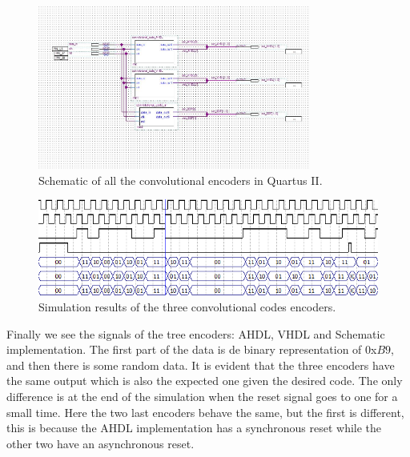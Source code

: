 \documentclass[12pt]{article}   	%
\begin{document}
\begin{figure}[htbp]
\begin{center}
\includegraphics[width=0.8\textwidth]{img/conv_code_comparison.jpg}
\caption{Schematic of all the convolutional encoders in Quartus II.}
\label{fig:conv_code_comp}
\end{center}
\end{figure}



\begin{figure}[htbp]
\begin{center}
\includegraphics[width=\textwidth]{img/conv_code_comp_sim}
\caption{Simulation results of the three convolutional codes encoders.}
\label{fig:sim_conv_code}
\end{center}
\end{figure}


Finally we see the signals of the tree encoders: AHDL, VHDL and Schematic implementation. The first part of the data is de binary representation of 0x$B9$, and then there is some random data. It is evident that the three encoders have the same output which is also the expected one given the desired code. The only difference is at the end of the simulation when the reset signal goes to one for a small time. Here the two last encoders behave the same, but the first is different, this is because the AHDL implementation has a synchronous reset while the other two have an asynchronous reset.



\newpage
\end{document}
